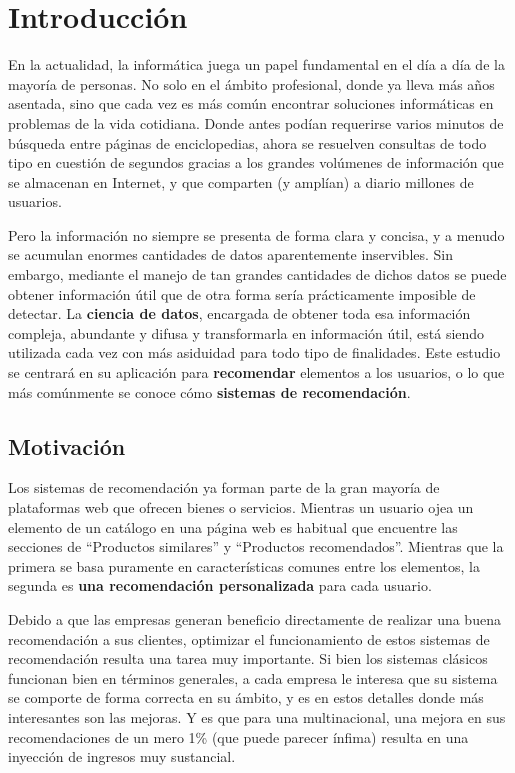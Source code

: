 \chapter{Introducción}

En la actualidad, la informática juega un papel fundamental en el día a día de la mayoría de personas. No solo en el ámbito profesional, donde ya lleva más años asentada, sino que cada vez es más común encontrar soluciones informáticas en problemas de la vida cotidiana. Donde antes podían requerirse varios minutos de búsqueda entre páginas de enciclopedias, ahora se resuelven consultas de todo tipo en cuestión de segundos gracias a los grandes volúmenes de información que se almacenan en Internet, y que comparten (y amplían) a diario millones de usuarios.

Pero la información no siempre se presenta de forma clara y concisa, y a menudo se acumulan enormes cantidades de datos aparentemente inservibles. Sin embargo, mediante el manejo de tan grandes cantidades de dichos datos se puede obtener información útil que de otra forma sería prácticamente imposible de detectar. La \textbf{ciencia de datos}, encargada de obtener toda esa información compleja, abundante y difusa y transformarla en información útil, está siendo utilizada cada vez con más asiduidad para todo tipo de finalidades. Este estudio se centrará en su aplicación para \textbf{recomendar} elementos a los usuarios, o lo que más comúnmente se conoce cómo \textbf{sistemas de recomendación}.

\section{Motivación}

Los sistemas de recomendación ya forman parte de la gran mayoría de plataformas web que ofrecen bienes o servicios. Mientras un usuario ojea un elemento de un catálogo en una página web es habitual que encuentre las secciones de ``Productos similares'' y ``Productos recomendados''. Mientras que la primera se basa puramente en características comunes entre los elementos, la segunda es \textbf{una recomendación personalizada} para cada usuario.

Debido a que las empresas generan beneficio directamente de realizar una buena recomendación a sus clientes, optimizar el funcionamiento de estos sistemas de recomendación resulta una tarea muy importante. Si bien los sistemas clásicos funcionan bien en términos generales, a cada empresa le interesa que su sistema se comporte de forma correcta en su ámbito, y es en estos detalles donde más interesantes son las mejoras. Y es que para una multinacional, una mejora en sus recomendaciones de un mero 1\% (que puede parecer ínfima) resulta en una inyección de ingresos muy sustancial.

